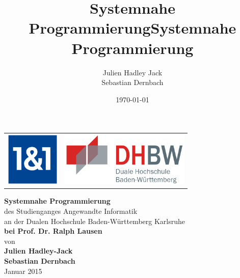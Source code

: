\documentclass[
    pagesize=pdftex,    %
    twoside=false,      %
    fontsize=12pt,      %
    parskip=half,       %
    headsepline,        %
    footsepline,        %
    abstract=false,     %
    listof=totoc,       %
    toc=bibliography,   %
]{scrreprt}
\title{Systemnahe Programmierung}
\author{}
\date{\today}
\begin{document}



\title{Systemnahe Programmierung}



\author{
        Julien Hadley Jack \\
        Sebastian Dernbach \\
       }


\begin{titlepage}
	\begin{longtable}{p{} p{}}
	  {\includegraphics[height=2.6cm]{images/1und1-logo}} & 
	  {\includegraphics[height=2.6cm]{images/dhbw.png}}
	\end{longtable}
	\enlargethispage{20mm}
	\begin{center}
	  \vspace*{12mm}	{\LARGE\bf Systemnahe Programmierung}\\
	  \vspace*{12mm}	des Studienganges Angewandte Informatik\\
	  \vspace*{3mm} 	an der Dualen Hochschule Baden-Württemberg Karlsruhe\\
	  \vspace*{12mm}	{\large\bf bei Prof. Dr. Ralph Lausen}\\
	  \vspace*{12mm}	von\\
	  \vspace*{3mm} 	{\large\bf Julien Hadley-Jack\\Sebastian Dernbach}\\
	  \vspace*{12mm}	Januar 2015\\
	\end{center}
	\vfill
\end{titlepage}
\end{document}
